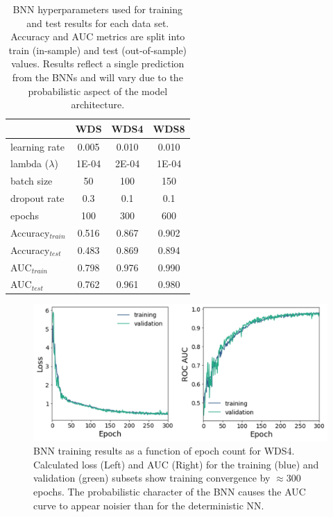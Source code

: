 \begin{table}[htp]
\centering
\begin{tabular}{l|c|c|c|}
\cline{2-4}
                                      & WDS   & WDS4  & WDS8  \\ \hline
\multicolumn{1}{|l|}{learning rate}   & 0.005 & 0.010 & 0.010 \\ \hline
\multicolumn{1}{|l|}{lambda ($\lambda$)} & 1E-04 & 2E-04 & 1E-04 \\ \hline
\multicolumn{1}{|l|}{batch size}      & 50    & 100   & 150   \\ \hline
\multicolumn{1}{|l|}{dropout rate}    & 0.3   & 0.1   & 0.1   \\ \hline
\multicolumn{1}{|l|}{epochs}          & 100   & 300   & 600   \\ \hline
\multicolumn{1}{|l|}{Accuracy$_{train}$} & 0.516 & 0.867 & 0.902 \\ \hline
\multicolumn{1}{|l|}{Accuracy$_{test}$}  & 0.483 & 0.869 & 0.894 \\ \hline
\multicolumn{1}{|l|}{AUC$_{train}$}      & 0.798 & 0.976 & 0.990 \\ \hline
\multicolumn{1}{|l|}{AUC$_{test}$}       & 0.762 & 0.961 & 0.980 \\ \hline
\end{tabular}
\singlespacing
\caption[Bayesian neural network single-run metrics]{BNN hyperparameters used for training and test results for each data set. Accuracy and AUC metrics are split into train (in-sample) and test (out-of-sample) values. Results reflect a single prediction from the BNNs and will vary due to the probabilistic aspect of the model architecture.}
\label{tab:bnn_metrics}
\end{table}

\begin{figure}[!htp]
\centering
\includegraphics[width=\textwidth]{templates/images/Figure-BNN_Loss_AUC_WDS4.png}
\caption[Bayesian neural network training loss]{BNN training results as a function of epoch count for WDS4. Calculated loss (Left) and AUC (Right) for the training (blue) and validation (green) subsets show training convergence by $\approx 300$ epochs. The probabilistic character of the BNN causes the AUC curve to appear noisier than for the deterministic NN.}
\label{fig:bnn_loss}
\end{figure}


